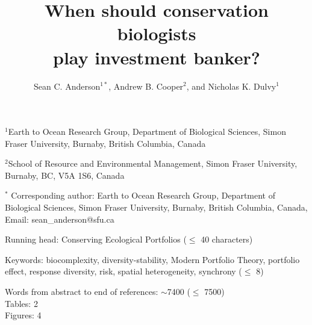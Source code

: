 \documentclass[12pt]{article}
\title{
  When should conservation biologists\\play investment banker?}
\author{Sean C. Anderson$^{1\ast}$,
  Andrew B. Cooper$^2$,
  and Nicholas K. Dulvy$^1$}
\date{}
\begin{document}
\maketitle
$^1$Earth to Ocean Research Group,
Department of Biological Sciences,
Simon Fraser University,
Burnaby, British Columbia, Canada

$^2$School of Resource and Environmental Management,
Simon Fraser University,
Burnaby, BC, V5A 1S6, Canada

$^{\ast}$
Corresponding author:
Earth to Ocean Research Group,
Department of Biological Sciences,
Simon Fraser University,
Burnaby, British Columbia, Canada,
Email: sean\_anderson@sfu.ca

Running head: Conserving Ecological Portfolios ($\le$ 40 characters)

Keywords:
biocomplexity,
diversity-stability,
Modern Portfolio Theory,
portfolio effect,
response diversity,
risk,
spatial heterogeneity,
synchrony
($\le$ 8)

Words from abstract to end of references: $\sim$7400 ($\le$ 7500)\\
Tables: 2\\
Figures: 4\\

\clearpage
\linenumbers
\begin{spacing}{1.6}

\end{spacing}
\end{document}
